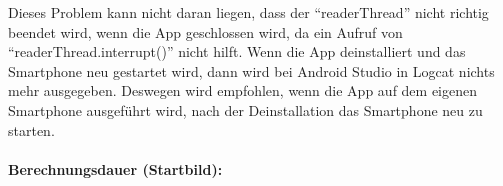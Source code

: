 \documentclass[12pt, onecolumn, notitlepage]{scrartcl}
\begin{document}
Dieses Problem kann nicht daran liegen, dass der \enquote{readerThread} nicht richtig beendet wird, wenn die App geschlossen wird, da ein Aufruf von \enquote{readerThread.interrupt()} nicht hilft. Wenn die App deinstalliert und das Smartphone neu gestartet wird, dann wird bei Android Studio in Logcat nichts mehr ausgegeben. Deswegen wird empfohlen, wenn die App auf dem eigenen Smartphone ausgeführt wird, nach der Deinstallation das Smartphone neu zu starten. \\ \\
\textbf{Berechnungsdauer (Startbild):}
\begin{table}[H] 
	\centering
\end{table}
\end{document}
